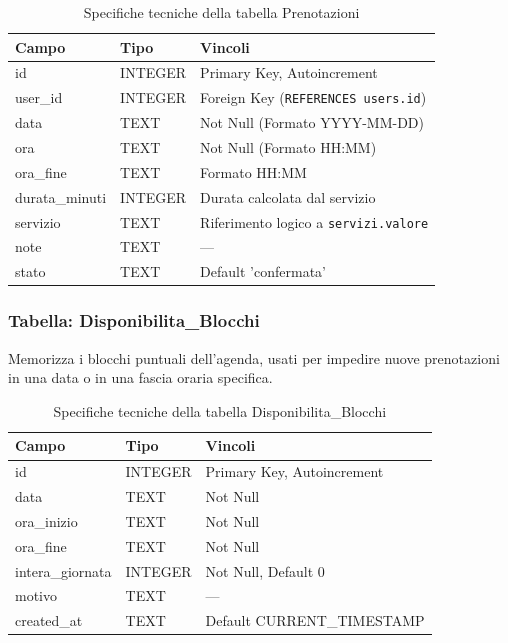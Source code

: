 \documentclass[12pt,a4paper]{article}
\begin{document}
\begin{table}[h!]
\centering

\vspace{0.4cm}

\begin{tabular}{lll}
    \toprule
    \textbf{Campo} & \textbf{Tipo} & \textbf{Vincoli} \\ 
    \midrule
    id             & INTEGER       & Primary Key, Autoincrement \\ 
    user\_id       & INTEGER       & Foreign Key (\texttt{REFERENCES users.id}) \\ 
    data           & TEXT          & Not Null (Formato YYYY-MM-DD) \\ 
    ora            & TEXT          & Not Null (Formato HH:MM) \\ 
    ora\_fine      & TEXT          & Formato HH:MM \\
    durata\_minuti & INTEGER       & Durata calcolata dal servizio \\
    servizio       & TEXT          & Riferimento logico a \texttt{servizi.valore} \\
    note           & TEXT          & --- \\ 
    stato          & TEXT          & Default 'confermata' \\
    \bottomrule
\end{tabular}
\caption{Specifiche tecniche della tabella Prenotazioni}
\end{table}

\subsubsection{Tabella: Disponibilita\_Blocchi}
Memorizza i blocchi puntuali dell'agenda, usati per impedire nuove prenotazioni in una data o in una fascia oraria specifica.

\begin{table}[h!]
\centering
\vspace{0.4cm}
\begin{tabular}{lll}
    \toprule
    \textbf{Campo} & \textbf{Tipo} & \textbf{Vincoli} \\
    \midrule
    id                  & INTEGER & Primary Key, Autoincrement \\
    data                & TEXT    & Not Null \\
    ora\_inizio         & TEXT    & Not Null \\
    ora\_fine           & TEXT    & Not Null \\
    intera\_giornata    & INTEGER & Not Null, Default 0 \\
    motivo              & TEXT    & --- \\
    created\_at         & TEXT    & Default CURRENT\_TIMESTAMP \\
    \bottomrule
\end{tabular}
\caption{Specifiche tecniche della tabella Disponibilita\_Blocchi}
\end{table}
\end{document}
